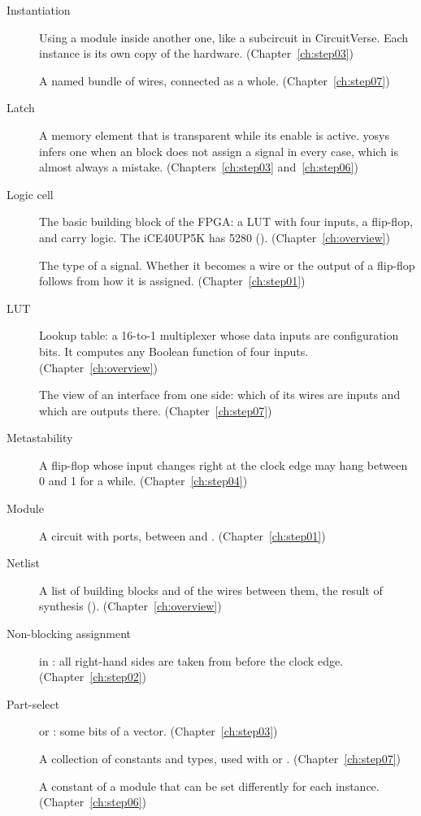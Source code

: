 \begin{description}
\item[Instantiation] Using a module inside another one, like a subcircuit in
  CircuitVerse. Each instance is its own copy of the hardware.
  (Chapter~\ref{ch:step03})
\item[] A named bundle of wires, connected as a whole.
  (Chapter~\ref{ch:step07})
\item[Latch] A memory element that is transparent while its enable is
  active. yosys infers one when an  block does not assign a
  signal in every case, which is almost always a mistake.
  (Chapters~\ref{ch:step03} and~\ref{ch:step06})
\item[Logic cell] The basic building block of the FPGA: a LUT with four
  inputs, a flip-flop, and carry logic. The iCE40UP5K has 5280
  (). (Chapter~\ref{ch:overview})
\item[] The type of a signal. Whether it becomes a wire or the
  output of a flip-flop follows from how it is assigned.
  (Chapter~\ref{ch:step01})
\item[LUT] Lookup table: a 16-to-1 multiplexer whose data inputs are
  configuration bits. It computes any Boolean function of four inputs.
  (Chapter~\ref{ch:overview})
\item[] The view of an interface from one side: which of its wires
  are inputs and which are outputs there. (Chapter~\ref{ch:step07})
\item[Metastability] A flip-flop whose input changes right at the clock edge
  may hang between 0 and 1 for a while. (Chapter~\ref{ch:step04})
\item[Module] A circuit with ports, between  and .
  (Chapter~\ref{ch:step01})
\item[Netlist] A list of building blocks and of the wires between them, the
  result of synthesis (). (Chapter~\ref{ch:overview})
\item[Non-blocking assignment] \cc{<=} in : all right-hand sides
  are taken from before the clock edge. (Chapter~\ref{ch:step02})
\item[Part-select]  or : some bits of a vector.
  (Chapter~\ref{ch:step03})
\item[] A collection of constants and types, used with
   or . (Chapter~\ref{ch:step07})
\item[] A constant of a module that can be set differently for
  each instance. (Chapter~\ref{ch:step06})

\end{description}

